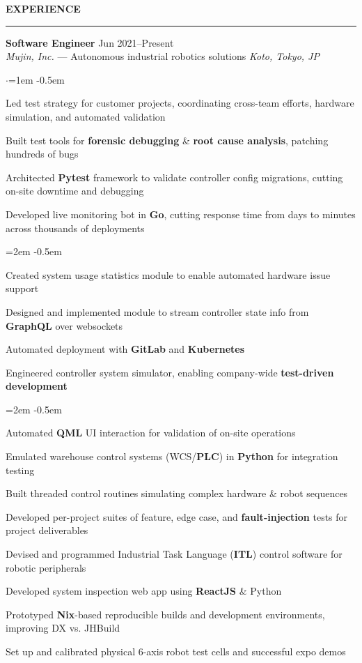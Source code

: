 \documentclass[10pt, a4paper]{article}
\newenvironment{aSection}[1]{
    \medskip \textbf{\uppercase{#1}}
    \smallskip
    \hrule
    \begin{list}{}{
            \setlength{\leftmargin}{1.5em}
        }
    \item[]
    }{
    \end{list}
}
\newenvironment{expSubsection}[4]{
    \textbf{#3} \hfill {#2} \\
    {#1} \hfill \textit{#4}
    \smallskip
    \begin{list}{$\cdot$}{\leftmargin=1em}
    \itemsep -0.5em \vspace{-0.5em}
    }{
    \end{list}
    \vspace{0.5em}
}
\newenvironment{subList}{
    \begin{list}{\raisebox{.4ex}{\tiny$\succ$}}{\leftmargin=2em}
    \itemsep -0.5em \vspace{-0.5em}
    }{
    \end{list}
}
\begin{document}
\begin{aSection}{Experience}
    \begin{expSubsection}
        {\textit{Mujin, Inc.} --- Autonomous industrial robotics solutions}
        {Jun 2021--Present}
        {Software Engineer}
        {Koto, Tokyo, JP}
    \item Led test strategy for customer projects, coordinating cross-team efforts, hardware simulation, and automated
        validation
    \item Built test tools for \textbf{forensic debugging} \& \textbf{root cause analysis}, patching hundreds of bugs
    \item Architected \textbf{Pytest} framework to validate controller config migrations, cutting on-site downtime and
        debugging
    \item Developed live monitoring bot in \textbf{Go}, cutting response time from days to minutes across thousands of
        deployments
        \begin{subList}
        \item Created system usage statistics module to enable automated hardware issue support
        \item Designed and implemented module to stream controller state info from \textbf{GraphQL} over websockets
        \item Automated deployment with \textbf{GitLab} and \textbf{Kubernetes}
        \end{subList}
    \item Engineered controller system simulator, enabling company-wide \textbf{test-driven development}
        \begin{subList}
        \item Automated \textbf{QML} UI interaction for validation of on-site operations
        \item Emulated warehouse control systems (WCS/\textbf{PLC}) in \textbf{Python} for integration testing
        \item Built threaded control routines simulating complex hardware \& robot sequences
        \item Developed per-project suites of feature, edge case, and \textbf{fault-injection} tests for project
            deliverables
        \end{subList}
    \item Devised and programmed Industrial Task Language (\textbf{ITL}) control software for robotic peripherals
    \item Developed system inspection web app using \textbf{ReactJS} \& Python
    \item Prototyped \textbf{Nix}-based reproducible builds and development environments, improving DX vs. JHBuild
    \item Set up and calibrated physical 6-axis robot test cells and successful expo demos
    \end{expSubsection}


\end{aSection}
\end{document}
